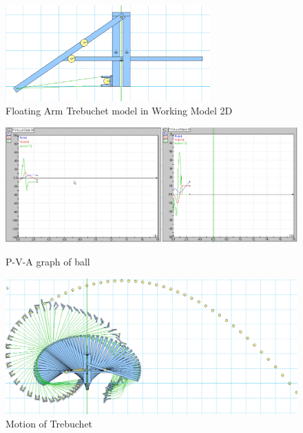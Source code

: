 \documentclass[12pt, titlepage]{article}
\begin{document}
    \begin{figure}[t]                                  
    \centering
    \includegraphics[width=0.7\textwidth]{figures/Model.png}
    \caption{Floating Arm Trebuchet model in Working Model 2D\label{model}}
    \end{figure}

\begin{figure}[b]
    \begin{minipage}[t]{0.69\textwidth}
        \vspace{12pt}
        \begin{flushleft}
            \includegraphics[width=\textwidth]{figures/Graphs.png}
        \end{flushleft}
        \caption{P-V-A graph of ball\label{graphs}}
    \end{minipage}
    \hfill
    \begin{minipage}[t]{0.3\textwidth}
        \vspace{50pt}
        \begin{flushright}
            \includegraphics[width=\textwidth]{figures/Motion.png}
        \end{flushright}
        \caption{Motion of Trebuchet\label{motion}}
    \end{minipage}
    \end{figure}
    \newpage
\end{document}
